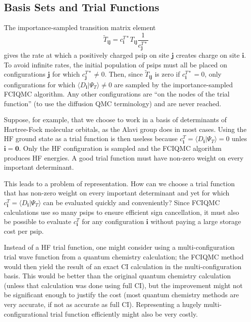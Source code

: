 \documentclass{article}
\newcommand{\bi}{\boldsymbol{i}}
\newcommand{\bj}{\boldsymbol{j}}
\newcommand{\bzero}{\boldsymbol{0}}
\begin{document}
\begin{description}
\end{description} 


\subsection{Basis Sets and Trial Functions}

The importance-sampled transition matrix element
\begin{displaymath}
\tilde{T}_{\bi\bj} = c_{\bi}^{T\ast} T_{\bi\bj}
\frac{1}{c_{\bj}^{T\ast}}
\end{displaymath}
gives the rate at which a positively charged psip on site $\bj$
creates charge on site $\bi$. To avoid infinite rates, the initial
population of psips must all be placed on configurations $\bj$ for
which $c_{\bj}^{T\ast} \neq 0$. Then, since $\tilde{T}_{\bi\bj}$ is
zero if $c_{\bi}^{T\ast} = 0$, only configurations for which $\langle
D_{\bi} | \Psi_T \rangle \neq 0$ are sampled by the importance-sampled
FCIQMC algorithm. Any other configurations are ``on the nodes of the
trial function'' (to use the diffusion QMC terminology) and are never
reached.

Suppose, for example, that we choose to work in a basis of
determinants of Hartree-Fock molecular orbitals, as the Alavi group
does in most cases. Using the HF ground state as a trial function is
then useless because $c_{\bi}^T = \langle D_{\bi}^{\,} | \Psi_T^{\,}
\rangle = 0$ unles $\bi = \bzero$. Only the HF configuration is
sampled and the FCIQMC algorithm produces HF energies. A good trial
function must have non-zero weight on every important determinant.

This leads to a problem of representation. How can we choose a trial
function that has non-zero weight on every important determinant and
yet for which $c_{\bi}^{T} = \langle D_{\bi} | \Psi_T \rangle$ can be
evaluated quickly and conveniently? Since FCIQMC calculations use so
many psips to ensure efficient sign cancellation, it must also be
possible to evaluate $c_{\bi}^{T}$ for any configuration $\bi$ without
paying a large storage cost per psip.

Instead of a HF trial function, one might consider using a
multi-configuration trial wave function from a quantum chemistry
calculation; the FCIQMC method would then yield the result of an exact
CI calculation in the multi-configuration basis. This would be better
than the original quantum chemistry calculation (unless that
calculation was done using full CI), but the improvement might not be
significant enough to justify the cost (most quantum chemistry methods
are very accurate, if not as accurate as full CI). Representing a
hugely multi-configurational trial function efficiently might also be
very costly.
\end{document}

